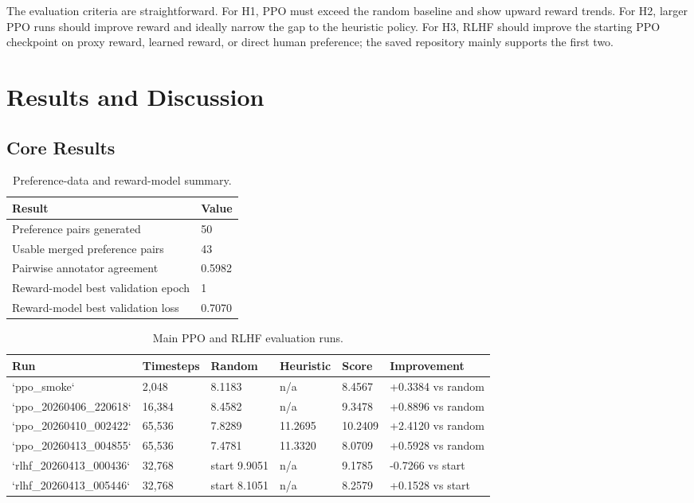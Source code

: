 \documentclass{article}
\begin{document}
The evaluation criteria are straightforward. For H1, PPO must exceed the random baseline and show upward reward trends. For H2, larger PPO runs should improve reward and ideally narrow the gap to the heuristic policy. For H3, RLHF should improve the starting PPO checkpoint on proxy reward, learned reward, or direct human preference; the saved repository mainly supports the first two.

\section{Results and Discussion}

\subsection{Core Results}

\begin{table}[t]
\centering
\caption{Preference-data and reward-model summary.}
\begin{tabular}{ll}
\toprule
Result & Value \\
\midrule
Preference pairs generated & 50 \\
Usable merged preference pairs & 43 \\
Pairwise annotator agreement & 0.5982 \\
Reward-model best validation epoch & 1 \\
Reward-model best validation loss & 0.7070 \\
\bottomrule
\end{tabular}
\end{table}

\begin{table}[t]
\centering
\caption{Main PPO and RLHF evaluation runs.}
\small
\begin{tabular}{llllll}
\toprule
Run & Timesteps & Random & Heuristic & Score & Improvement \\
\midrule
`ppo\_smoke` & 2,048 & 8.1183 & n/a & 8.4567 & +0.3384 vs random \\
`ppo\_20260406\_220618` & 16,384 & 8.4582 & n/a & 9.3478 & +0.8896 vs random \\
`ppo\_20260410\_002422` & 65,536 & 7.8289 & 11.2695 & 10.2409 & +2.4120 vs random \\
`ppo\_20260413\_004855` & 65,536 & 7.4781 & 11.3320 & 8.0709 & +0.5928 vs random \\
`rlhf\_20260413\_000436` & 32,768 & start 9.9051 & n/a & 9.1785 & -0.7266 vs start \\
`rlhf\_20260413\_005446` & 32,768 & start 8.1051 & n/a & 8.2579 & +0.1528 vs start \\
\bottomrule
\end{tabular}
\end{table}
\end{document}

